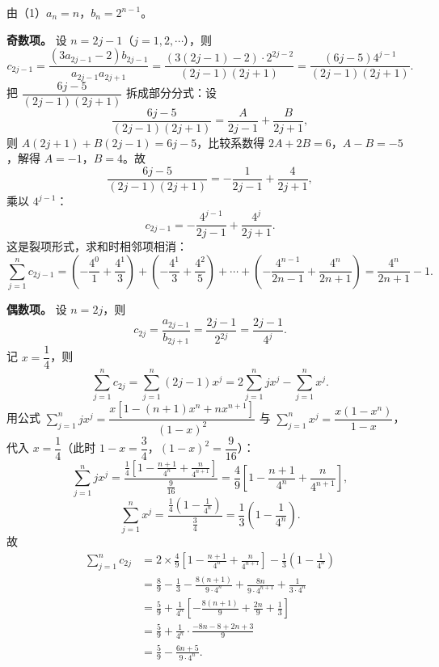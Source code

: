 \begin{answer}
由（1）$a_n=n$，$b_n=2^{n-1}$。

\textbf{奇数项。} 设 $n=2j-1$（$j=1,2,\cdots$），则
\nopagebreak[4]
\[c_{2j-1}=\frac{(3a_{2j-1}-2)b_{2j-1}}{a_{2j-1}a_{2j+1}}=\frac{(3(2j-1)-2)\cdot2^{2j-2}}{(2j-1)(2j+1)}=\frac{(6j-5)4^{j-1}}{(2j-1)(2j+1)} .\]
把 $\dfrac{6j-5}{(2j-1)(2j+1)}$ 拆成部分分式：设
\nopagebreak[4]
\[\frac{6j-5}{(2j-1)(2j+1)}=\frac{A}{2j-1}+\frac{B}{2j+1},\]
则 $A(2j+1)+B(2j-1)=6j-5$，比较系数得 $2A+2B=6$，$A-B=-5$，解得 $A=-1$，$B=4$。故
\nopagebreak[4]
\[\frac{6j-5}{(2j-1)(2j+1)}=-\frac1{2j-1}+\frac4{2j+1},\]
乘以 $4^{j-1}$：
\nopagebreak[4]
\[c_{2j-1}=-\frac{4^{j-1}}{2j-1}+\frac{4^{j}}{2j+1} .\]
这是裂项形式，求和时相邻项相消：
\nopagebreak[4]
\[\sum_{j=1}^{n}c_{2j-1}=\left(-\frac{4^0}{1}+\frac{4^1}{3}\right)+\left(-\frac{4^1}{3}+\frac{4^2}{5}\right)+\cdots+\left(-\frac{4^{n-1}}{2n-1}+\frac{4^n}{2n+1}\right)=\frac{4^n}{2n+1}-1 .\]

\textbf{偶数项。} 设 $n=2j$，则
\nopagebreak[4]
\[c_{2j}=\frac{a_{2j-1}}{b_{2j+1}}=\frac{2j-1}{2^{2j}}=\frac{2j-1}{4^j} .\]
记 $x=\dfrac14$，则
\nopagebreak[4]
\[\sum_{j=1}^n c_{2j}=\sum_{j=1}^n(2j-1)x^j=2\sum_{j=1}^n jx^j-\sum_{j=1}^n x^j .\]
用公式 $\sum\limits_{j=1}^n jx^j=\dfrac{x\left[1-(n+1)x^n+nx^{n+1}\right]}{(1-x)^2}$ 与 $\sum\limits_{j=1}^n x^j=\dfrac{x(1-x^n)}{1-x}$，代入 $x=\dfrac14$（此时 $1-x=\dfrac34$，$(1-x)^2=\dfrac9{16}$）：
\nopagebreak[4]
\[\sum_{j=1}^n jx^j=\frac{\frac14\left[1-\frac{n+1}{4^n}+\frac n{4^{n+1}}\right]}{\frac9{16}}=\frac49\left[1-\frac{n+1}{4^n}+\frac n{4^{n+1}}\right],\]
\nopagebreak[4]
\[\sum_{j=1}^n x^j=\frac{\frac14\left(1-\frac1{4^n}\right)}{\frac34}=\frac13\left(1-\frac1{4^n}\right).\]
故
\nopagebreak[4]
\[\begin{aligned}
\sum_{j=1}^n c_{2j}
&=2\times\frac49\left[1-\frac{n+1}{4^n}+\frac n{4^{n+1}}\right]-\frac13\left(1-\frac1{4^n}\right)\\
&=\frac89-\frac13-\frac{8(n+1)}{9\cdot4^n}+\frac{8n}{9\cdot4^{n+1}}+\frac1{3\cdot4^n}\\
&=\frac59+\frac1{4^n}\left[-\frac{8(n+1)}9+\frac{2n}9+\frac13\right]\\
&=\frac59+\frac1{4^n}\cdot\frac{-8n-8+2n+3}{9}\\
&=\frac59-\frac{6n+5}{9\cdot4^n} .
\end{aligned}\]


\end{answer}
